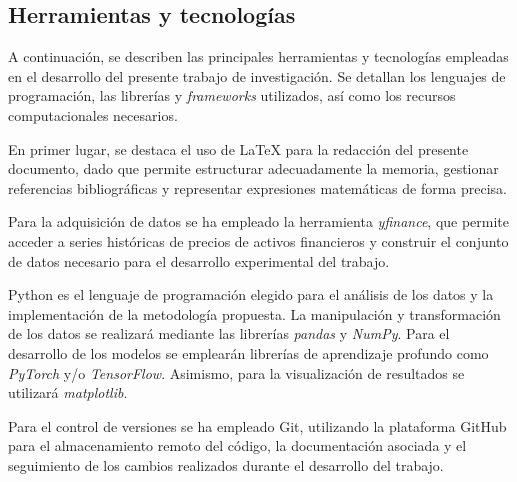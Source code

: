 \subsection{Herramientas y tecnologías}

A continuación, se describen las principales herramientas y tecnologías empleadas en el desarrollo del presente trabajo de investigación. Se detallan los lenguajes de programación, las librerías y \textit{frameworks} utilizados, así como los recursos computacionales necesarios.

En primer lugar, se destaca el uso de LaTeX para la redacción del presente documento, dado que permite estructurar adecuadamente la memoria, gestionar referencias bibliográficas y representar expresiones matemáticas de forma precisa.

Para la adquisición de datos se ha empleado la herramienta \textit{yfinance}, que permite acceder a series históricas de precios de activos financieros y construir el conjunto de datos necesario para el desarrollo experimental del trabajo.

Python es el lenguaje de programación elegido para el análisis de los datos y la implementación de la metodología propuesta. La manipulación y transformación de los datos se realizará mediante las librerías \textit{pandas} y \textit{NumPy}. Para el desarrollo de los modelos se emplearán librerías de aprendizaje profundo como \textit{PyTorch} y/o \textit{TensorFlow}. Asimismo, para la visualización de resultados se utilizará \textit{matplotlib}.

Para el control de versiones se ha empleado Git, utilizando la plataforma GitHub para el almacenamiento remoto del código, la documentación asociada y el seguimiento de los cambios realizados durante el desarrollo del trabajo.
